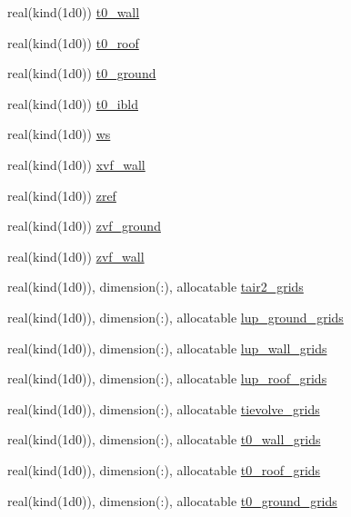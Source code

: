 \begin{DoxyCompactItemize}
\item 
real(kind(1d0)) \hyperlink{namespaceestm__data_aed2c55922d93ab016a0c88a5786c16c5}{t0\+\_\+wall}
\item 
real(kind(1d0)) \hyperlink{namespaceestm__data_a4d8c08047c27c858357a35947aa2cc8d}{t0\+\_\+roof}
\item 
real(kind(1d0)) \hyperlink{namespaceestm__data_a2dbe0d9dc5c526a806a724c6b200a172}{t0\+\_\+ground}
\item 
real(kind(1d0)) \hyperlink{namespaceestm__data_a37971a0ee2a83ac906b6ae92bfc91f7d}{t0\+\_\+ibld}
\item 
real(kind(1d0)) \hyperlink{namespaceestm__data_afbfac6ece52d6f190b854a3d3dd59631}{ws}
\item 
real(kind(1d0)) \hyperlink{namespaceestm__data_aea93574cedba3c739a606830f554c1c8}{xvf\+\_\+wall}
\item 
real(kind(1d0)) \hyperlink{namespaceestm__data_a7a588a40e148a295f285c787a02ade42}{zref}
\item 
real(kind(1d0)) \hyperlink{namespaceestm__data_a365fa91a213f8ebc878031e257ce4fd8}{zvf\+\_\+ground}
\item 
real(kind(1d0)) \hyperlink{namespaceestm__data_a6b3a0a92c8d41c4040f316204cd7a6ec}{zvf\+\_\+wall}
\item 
real(kind(1d0)), dimension(\+:), allocatable \hyperlink{namespaceestm__data_a748eeedc041c2a83b7242c1d000c349d}{tair2\+\_\+grids}
\item 
real(kind(1d0)), dimension(\+:), allocatable \hyperlink{namespaceestm__data_a977124a50a548296f4426725f2a326e2}{lup\+\_\+ground\+\_\+grids}
\item 
real(kind(1d0)), dimension(\+:), allocatable \hyperlink{namespaceestm__data_aad6c08dce02c049effc5aea3125cd83b}{lup\+\_\+wall\+\_\+grids}
\item 
real(kind(1d0)), dimension(\+:), allocatable \hyperlink{namespaceestm__data_a0086dd575cf8c39c41112cd3ce9ac5eb}{lup\+\_\+roof\+\_\+grids}
\item 
real(kind(1d0)), dimension(\+:), allocatable \hyperlink{namespaceestm__data_aea3b637710882c735bbac0ace538e0f4}{tievolve\+\_\+grids}
\item 
real(kind(1d0)), dimension(\+:), allocatable \hyperlink{namespaceestm__data_a0c43cee9369acd3b8e32a0bcdad1882c}{t0\+\_\+wall\+\_\+grids}
\item 
real(kind(1d0)), dimension(\+:), allocatable \hyperlink{namespaceestm__data_a78c65d6ac3d89929a7ca5e553a486600}{t0\+\_\+roof\+\_\+grids}
\item 
real(kind(1d0)), dimension(\+:), allocatable \hyperlink{namespaceestm__data_a140b49398b8c4930bdb307f71603c827}{t0\+\_\+ground\+\_\+grids}

\end{DoxyCompactItemize}
